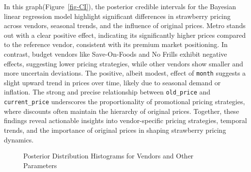 \documentclass[
  letterpaper,
  DIV=11,
  numbers=noendperiod]{scrartcl}
\begin{document}
In this graph(Figure~\ref{fig-CI}), the posterior credible intervals for
the Bayesian linear regression model highlight significant differences
in strawberry pricing across vendors, seasonal trends, and the influence
of original prices. Metro stands out with a clear positive effect,
indicating its significantly higher prices compared to the reference
vendor, consistent with its premium market positioning. In contrast,
budget vendors like Save-On-Foods and No Frills exhibit negative
effects, suggesting lower pricing strategies, while other vendors show
smaller and more uncertain deviations. The positive, albeit modest,
effect of \texttt{month} suggests a slight upward trend in prices over
time, likely due to seasonal demand or inflation. The strong and precise
relationship between \texttt{old\_price} and \texttt{current\_price}
underscores the proportionality of promotional pricing strategies, where
discounts often maintain the hierarchy of original prices. Together,
these findings reveal actionable insights into vendor-specific pricing
strategies, temporal trends, and the importance of original prices in
shaping strawberry pricing dynamics.

\begin{figure}


\caption{\label{fig-posterior}Posterior Distribution Histograms for
Vendors and Other Parameters}

\end{figure}%
\end{document}
